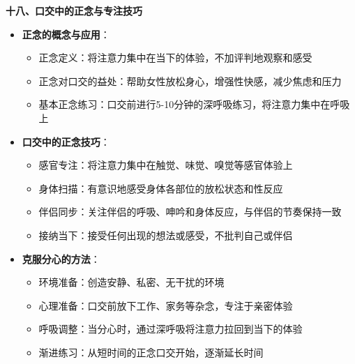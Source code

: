 \documentclass[12pt,UTF8]{ctexbook}
\begin{document}
  \textbf{十八、口交中的正念与专注技巧}
  \begin{itemize}
  \item \textbf{正念的概念与应用}：
    \begin{itemize}
    \item 正念定义：将注意力集中在当下的体验，不加评判地观察和感受
    \item 正念对口交的益处：帮助女性放松身心，增强性快感，减少焦虑和压力
    \item 基本正念练习：口交前进行5-10分钟的深呼吸练习，将注意力集中在呼吸上
    \end{itemize}
  \item \textbf{口交中的正念技巧}：
    \begin{itemize}
    \item 感官专注：将注意力集中在触觉、味觉、嗅觉等感官体验上
    \item 身体扫描：有意识地感受身体各部位的放松状态和性反应
    \item 伴侣同步：关注伴侣的呼吸、呻吟和身体反应，与伴侣的节奏保持一致
    \item 接纳当下：接受任何出现的想法或感受，不批判自己或伴侣
    \end{itemize}
  \item \textbf{克服分心的方法}：
    \begin{itemize}
    \item 环境准备：创造安静、私密、无干扰的环境
    \item 心理准备：口交前放下工作、家务等杂念，专注于亲密体验
    \item 呼吸调整：当分心时，通过深呼吸将注意力拉回到当下的体验
    \item 渐进练习：从短时间的正念口交开始，逐渐延长时间
    \end{itemize}
  \end{itemize}
\end{document}
